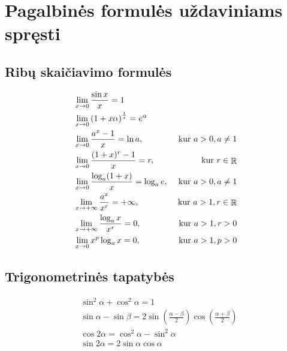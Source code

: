 \appendix
\chapter{Pagalbinės formulės uždaviniams spręsti}

\section{Ribų skaičiavimo formulės}

\begin{align} 
%
  &\lim _{x \to 0} \frac{\sin x}{x} = 1
  \label{f_lim_sin} \\
%
  &\lim _{x \to 0} \left( 1 + x \alpha \right)^{\frac{1}{x}} = e^{\alpha}
  \label{f_lim_exp} \\
%
  &\lim _{x \to 0} \frac{a^x - 1}{x} = \ln a, 
  & \text{ kur } a > 0, a \neq 1
  \label{f_lim_ep} \\
% 
  &\lim _{x \to 0} \frac{(1 + x)^r -1}{x} = r, & \text{ kur } r \in \RSET
  \label{f_lim_lp} \\
%
  &\lim _{x \to 0} \frac{\log _{a} (1 + x)}{x} = \log _{a} e, 
  & \text{ kur } a > 0, a \neq 1
  \label{f_lim_log} \\
%
  &\lim _{x \to +\infty} \frac{a^x}{x^r} = +\infty, 
  & \text{ kur } a > 1, r \in \RSET
  \label{f_lim_rl} \\
% 
  &\lim _{x \to +\infty} \frac{\log _{a} x}{x^r} = 0,
  & \text{ kur } a > 1, r > 0
  \label{f_lim_llb} \\
%
  &\lim _{x \to 0} x^p \log _{a} x = 0, & \text{ kur } a > 1, p > 0
  \label{f_lim_lln}
%
\end{align}

\section{Trigonometrinės tapatybės}

\begin{align}
%
  & \sin ^{2} \alpha + \cos ^{2} \alpha = 1
  \label{f_tri_kvsum} \\
%
  & \sin \alpha - \sin \beta = 2 
    \sin \left( \frac{\alpha - \beta}{2} \right)
    \cos \left( \frac{\alpha + \beta}{2} \right)
  \label{f_tri_sinsk} \\
%
  & \cos 2 \alpha = \cos ^{2} \alpha - \sin ^{2} \alpha
  \label{f_tri_dkcos} \\
%
  & \sin 2 \alpha = 2 \sin \alpha \cos \alpha
  \label{f_tri_dksin} 
%
\end{align}

